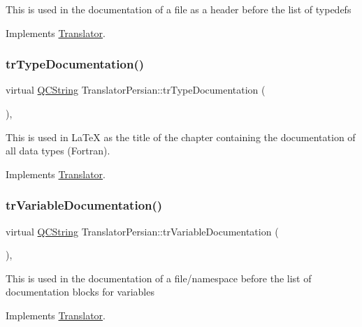 This is used in the documentation of a file as a header before the list of typedefs 

Implements \mbox{\hyperlink{class_translator}{Translator}}.

\mbox{\label{class_translator_persian_a35b3a955ce79b76af01b8f4bdf6a971f}} 
\subsubsection{\texorpdfstring{trTypeDocumentation()}{trTypeDocumentation()}}
{\footnotesize\ttfamily virtual \mbox{\hyperlink{class_q_c_string}{Q\+C\+String}} Translator\+Persian\+::tr\+Type\+Documentation (\begin{DoxyParamCaption}{ }\end{DoxyParamCaption})\hspace{0.3cm}{\ttfamily [inline]}, {\ttfamily [virtual]}}

This is used in La\+TeX as the title of the chapter containing the documentation of all data types (Fortran). 

Implements \mbox{\hyperlink{class_translator}{Translator}}.

\mbox{\label{class_translator_persian_aabf3acd2c5852f0e6e2fda6b9d05f8b5}} 
\subsubsection{\texorpdfstring{trVariableDocumentation()}{trVariableDocumentation()}}
{\footnotesize\ttfamily virtual \mbox{\hyperlink{class_q_c_string}{Q\+C\+String}} Translator\+Persian\+::tr\+Variable\+Documentation (\begin{DoxyParamCaption}{ }\end{DoxyParamCaption})\hspace{0.3cm}{\ttfamily [inline]}, {\ttfamily [virtual]}}

This is used in the documentation of a file/namespace before the list of documentation blocks for variables 

Implements \mbox{\hyperlink{class_translator}{Translator}}.

